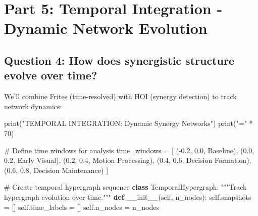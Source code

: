 \documentclass[
  11pt,
  letterpaper,
  oneside,
  openany]{book}
\newenvironment{Shaded}{\begin{snugshade}}{\end{snugshade}}
\newcommand{\BuiltInTok}[1]{\textcolor[rgb]{0.00,0.23,0.31}{#1}}
\newcommand{\CommentTok}[1]{\textcolor[rgb]{0.37,0.37,0.37}{#1}}
\newcommand{\DecValTok}[1]{\textcolor[rgb]{0.68,0.00,0.00}{#1}}
\newcommand{\FloatTok}[1]{\textcolor[rgb]{0.68,0.00,0.00}{#1}}
\newcommand{\FunctionTok}[1]{\textcolor[rgb]{0.28,0.35,0.67}{#1}}
\newcommand{\KeywordTok}[1]{\textcolor[rgb]{0.00,0.23,0.31}{\textbf{#1}}}
\newcommand{\NormalTok}[1]{\textcolor[rgb]{0.00,0.23,0.31}{#1}}
\newcommand{\OperatorTok}[1]{\textcolor[rgb]{0.37,0.37,0.37}{#1}}
\newcommand{\StringTok}[1]{\textcolor[rgb]{0.13,0.47,0.30}{#1}}
\newcommand{\VariableTok}[1]{\textcolor[rgb]{0.07,0.07,0.07}{#1}}
\begin{document}
\section{Part 5: Temporal Integration - Dynamic Network
Evolution}\label{part-5-temporal-integration---dynamic-network-evolution}

\subsection{Question 4: How does synergistic structure evolve over
time?}\label{question-4-how-does-synergistic-structure-evolve-over-time}

We'll combine Frites (time-resolved) with HOI (synergy detection) to
track network dynamics:

\begin{Shaded}
\begin{Highlighting}[]
\BuiltInTok{print}\NormalTok{(}\StringTok{"TEMPORAL INTEGRATION: Dynamic Synergy Networks"}\NormalTok{)}
\BuiltInTok{print}\NormalTok{(}\StringTok{"="} \OperatorTok{*} \DecValTok{70}\NormalTok{)}

\CommentTok{\# Define time windows for analysis}
\NormalTok{time\_windows }\OperatorTok{=}\NormalTok{ [}
\NormalTok{    (}\OperatorTok{{-}}\FloatTok{0.2}\NormalTok{, }\FloatTok{0.0}\NormalTok{, }\StringTok{\textquotesingle{}Baseline\textquotesingle{}}\NormalTok{),}
\NormalTok{    (}\FloatTok{0.0}\NormalTok{, }\FloatTok{0.2}\NormalTok{, }\StringTok{\textquotesingle{}Early Visual\textquotesingle{}}\NormalTok{),}
\NormalTok{    (}\FloatTok{0.2}\NormalTok{, }\FloatTok{0.4}\NormalTok{, }\StringTok{\textquotesingle{}Motion Processing\textquotesingle{}}\NormalTok{),}
\NormalTok{    (}\FloatTok{0.4}\NormalTok{, }\FloatTok{0.6}\NormalTok{, }\StringTok{\textquotesingle{}Decision Formation\textquotesingle{}}\NormalTok{),}
\NormalTok{    (}\FloatTok{0.6}\NormalTok{, }\FloatTok{0.8}\NormalTok{, }\StringTok{\textquotesingle{}Decision Maintenance\textquotesingle{}}\NormalTok{)}
\NormalTok{]}

\CommentTok{\# Create temporal hypergraph sequence}
\KeywordTok{class}\NormalTok{ TemporalHypergraph:}
    \CommentTok{"""Track hypergraph evolution over time."""}
    \KeywordTok{def} \FunctionTok{\_\_init\_\_}\NormalTok{(}\VariableTok{self}\NormalTok{, n\_nodes):}
        \VariableTok{self}\NormalTok{.snapshots }\OperatorTok{=}\NormalTok{ []}
        \VariableTok{self}\NormalTok{.time\_labels }\OperatorTok{=}\NormalTok{ []}
        \VariableTok{self}\NormalTok{.n\_nodes }\OperatorTok{=}\NormalTok{ n\_nodes}
    

\end{Highlighting}
\end{Shaded}
\end{document}
